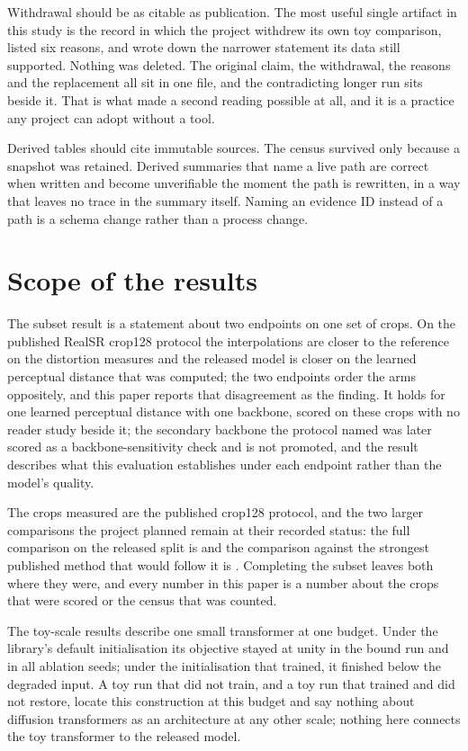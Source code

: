 Withdrawal should be as citable as publication. The most useful single artifact
in this study is the record in which the project withdrew its own toy
comparison, listed six reasons, and wrote down the narrower statement its data
still supported. Nothing was deleted. The original claim, the withdrawal, the
reasons and the replacement all sit in one file, and the contradicting longer
run sits beside it. That is what made a second reading possible at all, and it
is a practice any project can adopt without a tool.

Derived tables should cite immutable sources. The census survived only because
a snapshot was retained. Derived summaries that name a live path are correct
when written and become unverifiable the moment the path is rewritten, in a way
that leaves no trace in the summary itself. Naming an evidence ID instead of a
path is a schema change rather than a process change.

\section{Scope of the results}

The subset result is a statement about two endpoints on one set of crops. On
the published RealSR crop128 protocol the interpolations are closer to the
reference on the distortion measures and the released model is closer on the
learned perceptual distance that was computed; the two endpoints order the arms
oppositely, and this paper reports that disagreement as the finding. It holds
for one learned perceptual distance with one backbone, scored on these
\SubsetN{} crops with no reader study beside it; the secondary backbone the
protocol named was later scored as a backbone-sensitivity check and is not
promoted, and the result describes what this
evaluation establishes under each endpoint rather than the model's quality.

The crops measured are the published crop128 protocol, and the two larger
comparisons the project planned remain at their recorded status: the full
comparison on the released split is \PrimaryTier{} and the comparison against
the strongest published method that would follow it is \SotaTier{}. Completing
the subset leaves both where they were, and every number in this paper is a
number about the crops that were scored or the census that was counted.

The toy-scale results describe one small transformer at one budget. Under the
library's default initialisation its objective stayed at unity in the bound run
and in all \InitSeeds{} ablation seeds; under the initialisation that trained,
it finished below the degraded input. A toy run that did not train, and a toy
run that trained and did not restore, locate this construction at this budget
and say nothing about diffusion transformers as an architecture at any other
scale; nothing here connects the toy transformer to the released model.

